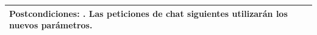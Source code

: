\begin{longtable}{|p{15cm}|}
  \rowcolor{ulepsbased}
  \textbf{Postcondiciones:} \newline
  1. Las peticiones de chat siguientes utilizarán los nuevos parámetros. \\ \hline

\end{longtable}
\endgroup

